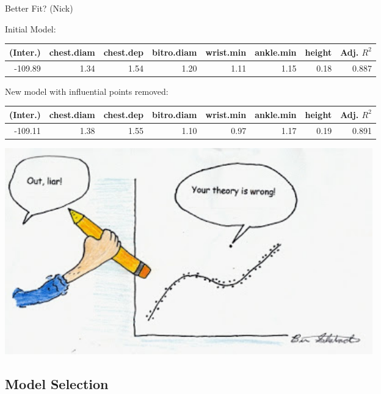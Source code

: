 \documentclass[table]{beamer}\usepackage[]{graphicx}\usepackage[]{color}
\begin{document}

\begin{frame} {Better Fit? (Nick)} 

Initial Model: \\

{\fontsize{0.275cm}{1em}\selectfont 
\begin{tabular}{|r|r|r|r|r|r|r|r|}
\hline
    (Inter.) & chest.diam & chest.dep & bitro.diam & wrist.min & ankle.min & height & Adj. $R^2$ \\ \hline
   -109.89 & 1.34  & 1.54 & 1.20  & 1.11 & 1.15 & 0.18 & 0.887 \\ \hline
   
\end{tabular}
}

\linebreak[4]

New model with influential points removed:\\

{\fontsize{0.275cm}{1em}\selectfont 
\begin{tabular}{|r|r|r|r|r|r|r|r|}
\hline
    (Inter.) & chest.diam & chest.dep & bitro.diam & wrist.min & ankle.min & height & Adj. $R^2$ \\ \hline
   -109.11 & 1.38  & 1.55 & 1.10  & 0.97 & 1.17 & 0.19 & 0.891 \\ \hline

\end{tabular}

}

\begin{center}
\includegraphics[width=0.7\textwidth]{outlier}
\end{center}

\end{frame}


\subsection{Model Selection}
\end{document}
